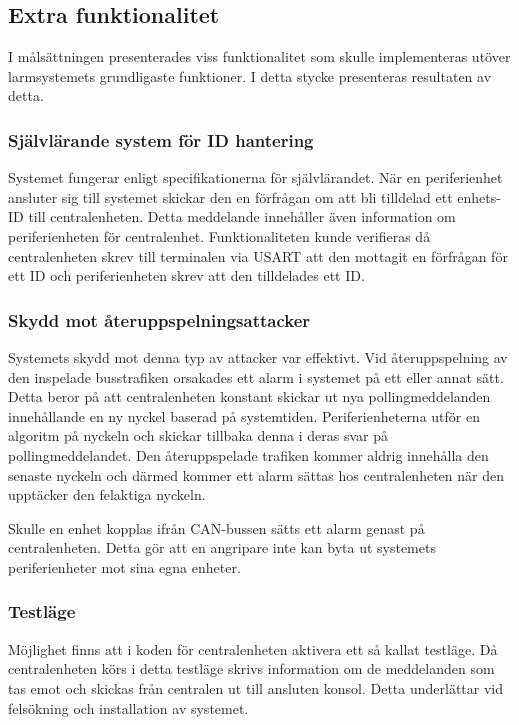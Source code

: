 \documentclass[a4paper]{article}
\begin{document}
\subsection{Extra funktionalitet}
I målsättningen presenterades viss funktionalitet som skulle implementeras utöver larmsystemets grundligaste funktioner.
I detta stycke presenteras resultaten av detta.

\subsubsection{Självlärande system för ID hantering}
Systemet fungerar enligt specifikationerna för självlärandet.
När en periferienhet ansluter sig till systemet skickar den en förfrågan om att bli tilldelad ett enhets-ID till centralenheten.
Detta meddelande innehåller även information om periferienheten för centralenhet.
Funktionaliteten kunde verifieras då centralenheten skrev till terminalen via USART att den mottagit en förfrågan för ett ID och periferienheten skrev att den tilldelades ett ID.

\subsubsection{Skydd mot återuppspelningsattacker}
Systemets skydd mot denna typ av attacker var effektivt.
Vid återuppspelning av den inspelade busstrafiken orsakades ett alarm i systemet på ett eller annat sätt.
Detta beror på att centralenheten konstant skickar ut nya pollingmeddelanden innehållande en ny nyckel baserad på systemtiden.
Periferienheterna utför en algoritm på nyckeln och skickar tillbaka denna i deras svar på pollingmeddelandet.
Den återuppspelade trafiken kommer aldrig innehålla den senaste nyckeln och därmed kommer ett alarm sättas hos centralenheten när den upptäcker den felaktiga nyckeln.

Skulle en enhet kopplas ifrån CAN-bussen sätts ett alarm genast på centralenheten.
Detta gör att en angripare inte kan byta ut systemets periferienheter mot sina egna enheter.

\subsubsection{Testläge}
Möjlighet finns att i koden för centralenheten aktivera ett så kallat testläge.
Då centralenheten körs i detta testläge skrivs information om de meddelanden som tas emot och skickas från centralen ut till ansluten konsol.
Detta underlättar vid felsökning och installation av systemet.
\end{document}
